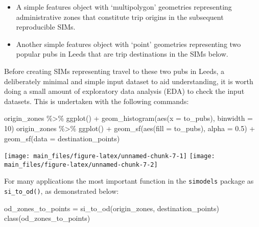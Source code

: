 \documentclass[11pt,letterpaper]{article}
\newenvironment{Shaded}{\begin{snugshade}}{\end{snugshade}}
\newcommand{\AttributeTok}[1]{\textcolor[rgb]{0.77,0.63,0.00}{#1}}
\newcommand{\DecValTok}[1]{\textcolor[rgb]{0.00,0.00,0.81}{#1}}
\newcommand{\FloatTok}[1]{\textcolor[rgb]{0.00,0.00,0.81}{#1}}
\newcommand{\FunctionTok}[1]{\textcolor[rgb]{0.00,0.00,0.00}{#1}}
\newcommand{\NormalTok}[1]{#1}
\newcommand{\OtherTok}[1]{\textcolor[rgb]{0.56,0.35,0.01}{#1}}
\newcommand{\SpecialCharTok}[1]{\textcolor[rgb]{0.00,0.00,0.00}{#1}}
\begin{document}
\begin{itemize}
\item
  A simple features object with `multipolygon' geometries representing administrative zones that constitute trip origins in the subsequent reproducible SIMs.
\item
  Another simple features object with `point' geometries representing two popular pubs in Leeds that are trip destinations in the SIMs below.
\end{itemize}

Before creating SIMs representing travel to these two pubs in Leeds, a deliberately minimal and simple input dataset to aid understanding, it is worth doing a small amount of exploratory data analysis (EDA) to check the input datasets.
This is undertaken with the following commands:

\begin{Shaded}
\begin{Highlighting}[]
\NormalTok{origin\_zones }\SpecialCharTok{\%\textgreater{}\%} 
  \FunctionTok{ggplot}\NormalTok{() }\SpecialCharTok{+}
  \FunctionTok{geom\_histogram}\NormalTok{(}\FunctionTok{aes}\NormalTok{(}\AttributeTok{x =}\NormalTok{ to\_pubs), }\AttributeTok{binwidth =} \DecValTok{10}\NormalTok{)}
\NormalTok{origin\_zones }\SpecialCharTok{\%\textgreater{}\%} 
  \FunctionTok{ggplot}\NormalTok{() }\SpecialCharTok{+}
  \FunctionTok{geom\_sf}\NormalTok{(}\FunctionTok{aes}\NormalTok{(}\AttributeTok{fill =}\NormalTok{ to\_pubs), }\AttributeTok{alpha =} \FloatTok{0.5}\NormalTok{) }\SpecialCharTok{+}
  \FunctionTok{geom\_sf}\NormalTok{(}\AttributeTok{data =}\NormalTok{ destination\_points)}
\end{Highlighting}
\end{Shaded}

\texttt{[image: main\_files/figure-latex/unnamed-chunk-7-1]} \texttt{[image: main\_files/figure-latex/unnamed-chunk-7-2]}

For many applications the most important function in the \texttt{simodels} package as \texttt{si\_to\_od()}, as demonstrated below:

\begin{Shaded}
\begin{Highlighting}[]
\NormalTok{od\_zones\_to\_points }\OtherTok{=} \FunctionTok{si\_to\_od}\NormalTok{(origin\_zones, destination\_points)}
\FunctionTok{class}\NormalTok{(od\_zones\_to\_points)}
\end{Highlighting}
\end{Shaded}
\end{document}
